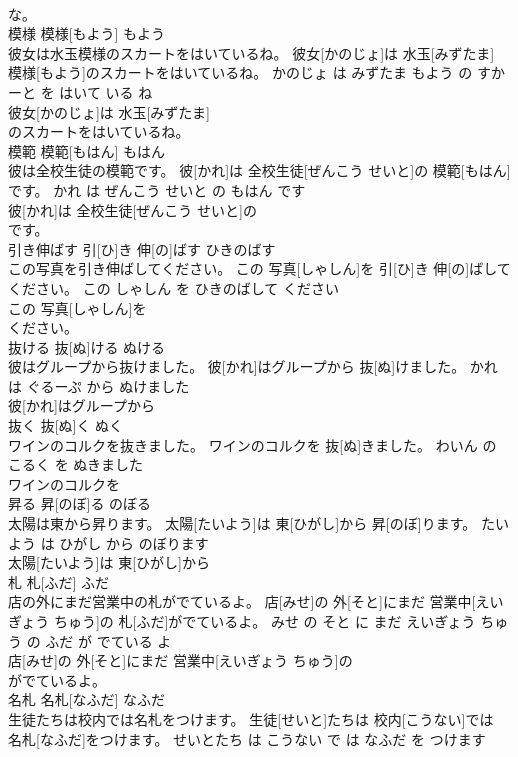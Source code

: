\documentclass[8pt]{extreport}
\begin{document}
\begin{CJK}{UTF8}{min}
\\	な。			
\\	模様	模様[もよう]	もよう	
\\	彼女は水玉模様のスカートをはいているね。	彼女[かのじょ]は 水玉[みずたま] 模様[もよう]のスカートをはいているね。	かのじょ は みずたま もよう の すかーと を はいて いる ね	
\\	彼女[かのじょ]は 水玉[みずたま]
\\	のスカートをはいているね。			
\\	模範	模範[もはん]	もはん	
\\	彼は全校生徒の模範です。	彼[かれ]は 全校生徒[ぜんこう せいと]の 模範[もはん]です。	かれ は ぜんこう せいと の もはん です	
\\	彼[かれ]は 全校生徒[ぜんこう せいと]の
\\	です。			
\\	引き伸ばす	引[ひ]き 伸[の]ばす	ひきのばす	
\\	この写真を引き伸ばしてください。	この 写真[しゃしん]を 引[ひ]き 伸[の]ばしてください。	この しゃしん を ひきのばして ください	
\\	この 写真[しゃしん]を
\\	ください。			
\\	抜ける	抜[ぬ]ける	ぬける	
\\	彼はグループから抜けました。	彼[かれ]はグループから 抜[ぬ]けました。	かれ は ぐるーぷ から ぬけました	
\\	彼[かれ]はグループから
\\	抜く	抜[ぬ]く	ぬく	
\\	ワインのコルクを抜きました。	ワインのコルクを 抜[ぬ]きました。	わいん の こるく を ぬきました	
\\	ワインのコルクを
\\	昇る	昇[のぼ]る	のぼる	
\\	太陽は東から昇ります。	太陽[たいよう]は 東[ひがし]から 昇[のぼ]ります。	たいよう は ひがし から のぼります	
\\	太陽[たいよう]は 東[ひがし]から
\\	札	札[ふだ]	ふだ	
\\	店の外にまだ営業中の札がでているよ。	店[みせ]の 外[そと]にまだ 営業中[えいぎょう ちゅう]の 札[ふだ]がでているよ。	みせ の そと に まだ えいぎょう ちゅう の ふだ が でている よ	
\\	店[みせ]の 外[そと]にまだ 営業中[えいぎょう ちゅう]の
\\	がでているよ。			
\\	名札	名札[なふだ]	なふだ	
\\	生徒たちは校内では名札をつけます。	生徒[せいと]たちは 校内[こうない]では 名札[なふだ]をつけます。	せいとたち は こうない で は なふだ を つけます	

\end{CJK}
\end{document}
